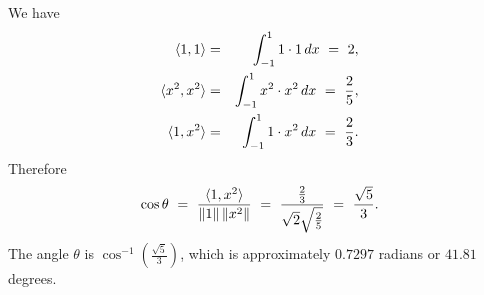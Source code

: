 \begin{solution}
  We have
  \begin{eqnarray*}
    \langle1,1\rangle &=& \int_{-1}^1 1\cdot 1\,dx ~=~ 2, \\
    \langle x^2,x^2\rangle &=& \int_{-1}^1 x^2\cdot x^2\,dx ~=~ \frac{2}{5}, \\
    \langle1, x^2\rangle &=& \int_{-1}^1 1\cdot x^2\,dx ~=~ \frac{2}{3}.
  \end{eqnarray*}
  Therefore
  \begin{equation*}
    \cos\theta
    ~=~ \frac{\langle1,x^2\rangle}{\left\|1\right\|\left\|x^2\right\|}
    ~=~ \frac{\frac{2}{3}}{\sqrt{2}\sqrt{\frac{2}{5}}}
    ~=~ \frac{\sqrt{5}}{3}.
  \end{equation*}
  The angle $\theta$ is $\cos^{-1}(\frac{\sqrt{5}}{3})$, which is
  approximately $0.7297$ radians or $41.81$ degrees.

\end{solution}
